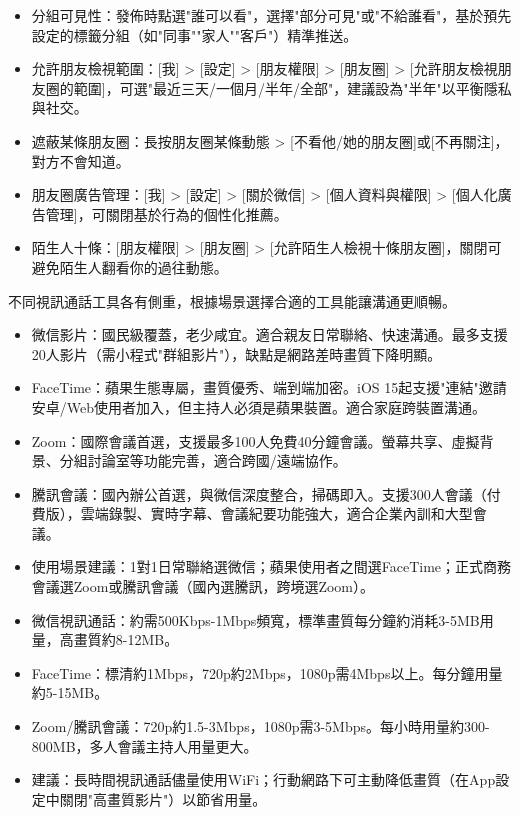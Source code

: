
\begin{itemize}
  \item 分組可見性：發佈時點選"誰可以看"，選擇"部分可見"或"不給誰看"，基於預先設定的標籤分組（如"同事""家人""客戶"）精準推送。
  \item 允許朋友檢視範圍：[我] > [設定] > [朋友權限] > [朋友圈] > [允許朋友檢視朋友圈的範圍]，可選"最近三天/一個月/半年/全部"，建議設為"半年"以平衡隱私與社交。
  \item 遮蔽某條朋友圈：長按朋友圈某條動態 > [不看他/她的朋友圈]或[不再關注]，對方不會知道。
  \item 朋友圈廣告管理：[我] > [設定] > [關於微信] > [個人資料與權限] > [個人化廣告管理]，可關閉基於行為的個性化推薦。
  \item 陌生人十條：[朋友權限] > [朋友圈] > [允許陌生人檢視十條朋友圈]，關閉可避免陌生人翻看你的過往動態。
\end{itemize}


不同視訊通話工具各有側重，根據場景選擇合適的工具能讓溝通更順暢。

\begin{itemize}
  \item 微信影片：國民級覆蓋，老少咸宜。適合親友日常聯絡、快速溝通。最多支援20人影片（需小程式"群組影片"），缺點是網路差時畫質下降明顯。
  \item FaceTime：蘋果生態專屬，畫質優秀、端到端加密。iOS 15起支援"連結"邀請安卓/Web使用者加入，但主持人必須是蘋果裝置。適合家庭跨裝置溝通。
  \item Zoom：國際會議首選，支援最多100人免費40分鐘會議。螢幕共享、虛擬背景、分組討論室等功能完善，適合跨國/遠端協作。
  \item 騰訊會議：國內辦公首選，與微信深度整合，掃碼即入。支援300人會議（付費版），雲端錄製、實時字幕、會議紀要功能強大，適合企業內訓和大型會議。
  \item 使用場景建議：1對1日常聯絡選微信；蘋果使用者之間選FaceTime；正式商務會議選Zoom或騰訊會議（國內選騰訊，跨境選Zoom）。
\end{itemize}


\begin{itemize}
  \item 微信視訊通話：約需500Kbps-1Mbps頻寬，標準畫質每分鐘約消耗3-5MB用量，高畫質約8-12MB。
  \item FaceTime：標清約1Mbps，720p約2Mbps，1080p需4Mbps以上。每分鐘用量約5-15MB。
  \item Zoom/騰訊會議：720p約1.5-3Mbps，1080p需3-5Mbps。每小時用量約300-800MB，多人會議主持人用量更大。
  \item 建議：長時間視訊通話儘量使用WiFi；行動網路下可主動降低畫質（在App設定中關閉"高畫質影片"）以節省用量。
\end{itemize}

